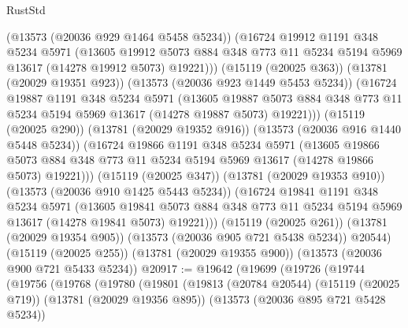 \begin{lexlean}{RustStd}
\begin{coremodule}
              (@13573 (@20036 @929 @1464 @5458 @5234))
              (@16724
                @19912
                @1191
                @348
                @5234
                @5971
                (@13605
                  @19912
                  @5073
                  @884
                  @348
                  @773
                  @11
                  @5234
                  @5194
                  @5969
                  @13617
                  (@14278 @19912 @5073)
                  @19221)))
            (@15119 (@20025 @363))
            (@13781 (@20029 @19351 @923))
            (@13573 (@20036 @923 @1449 @5453 @5234))
            (@16724
              @19887
              @1191
              @348
              @5234
              @5971
              (@13605
                @19887
                @5073
                @884
                @348
                @773
                @11
                @5234
                @5194
                @5969
                @13617
                (@14278 @19887 @5073)
                @19221)))
          (@15119 (@20025 @290))
          (@13781 (@20029 @19352 @916))
          (@13573 (@20036 @916 @1440 @5448 @5234))
          (@16724
            @19866
            @1191
            @348
            @5234
            @5971
            (@13605
              @19866
              @5073
              @884
              @348
              @773
              @11
              @5234
              @5194
              @5969
              @13617
              (@14278 @19866 @5073)
              @19221)))
        (@15119 (@20025 @347))
        (@13781 (@20029 @19353 @910))
        (@13573 (@20036 @910 @1425 @5443 @5234))
        (@16724
          @19841
          @1191
          @348
          @5234
          @5971
          (@13605
            @19841
            @5073
            @884
            @348
            @773
            @11
            @5234
            @5194
            @5969
            @13617
            (@14278 @19841 @5073)
            @19221)))
      (@15119 (@20025 @261))
      (@13781 (@20029 @19354 @905))
      (@13573 (@20036 @905 @721 @5438 @5234))
      @20544)
    (@15119 (@20025 @255))
    (@13781 (@20029 @19355 @900))
    (@13573 (@20036 @900 @721 @5433 @5234))
@20917 := @19642
    (@19699
      (@19726
        (@19744
          (@19756
            (@19768
              (@19780
                (@19801
                  (@19813
                    (@20784 @20544)
                    (@15119 (@20025 @719))
                    (@13781 (@20029 @19356 @895))
                    (@13573 (@20036 @895 @721 @5428 @5234))

\end{coremodule}
\end{lexlean}
